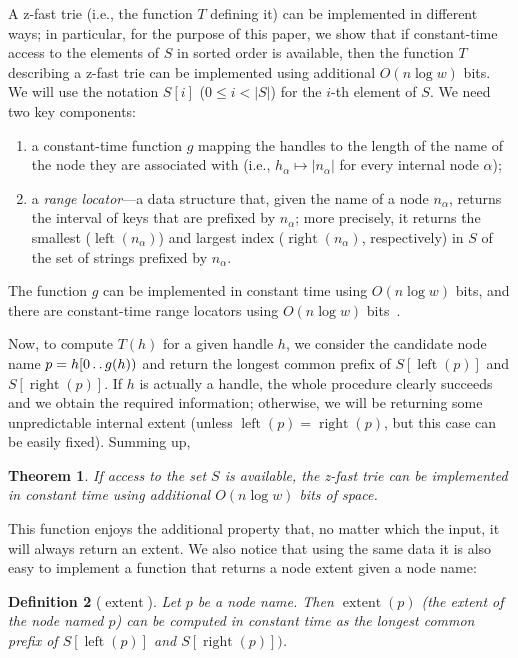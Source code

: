 \documentclass[a4paper,11pt]{article}
\newtheorem{theorem} {Theorem}[section]
\newtheorem{definition}[theorem]{Definition}
\newcommand{\?}{\mskip1.5mu}
\def\..{\,\mathpunct{\ldotp\ldotp}} %
\DeclareMathOperator{\lrange}{left}
\DeclareMathOperator{\rrange}{right}
\DeclareMathOperator{\extent}{extent}
\begin{document}
A z-fast trie (i.e., the function $T$ defining it) can be implemented in
different ways; in particular, for the purpose of this paper, we 
show that if constant-time access to the elements of $S$ in sorted order is
available, then the function $T$ describing a z-fast trie can be implemented using additional $O(n\log w)$ bits. We will use the
notation $S[i]$ ($0\leq i<|S|$) for the $i$-th element of $S$. We need two key
components:
\begin{enumerate}
  \item a constant-time function $g$ mapping the handles to the length of the
  name of the node they are associated with (i.e., $h_\alpha \mapsto
  |n_\alpha|$ for every internal node $\alpha$);
  \item a \emph{range locator}---a data structure that, given the name of a
  node $n_\alpha$, returns the interval of 
  keys that are prefixed by $n_\alpha$; more precisely, it returns the smallest
  ($\lrange(n_\alpha)$) and largest index ($\rrange(n_\alpha)$, respectively) in $S$ of
  the set of strings prefixed by $n_\alpha$.
\end{enumerate}
The function $g$ can be implemented in constant time using $O(n\log w)$ bits,
and there are constant-time range locators using $O(n\log w)$
bits~\cite{BelazzouguiBoPaVi09}.

Now, to compute $T(h)$ for a given handle $h$, we
consider the candidate node name $p = h[0\..g(h))$ and return the longest common
prefix of $S[\lrange(p)]$ and $S[\rrange(p)]$. If $h$ is actually a handle, the whole procedure clearly succeeds and
we obtain the required information; otherwise, we will be returning
some unpredictable internal extent (unless $\lrange(p)=\rrange(p)$, but this
case can be easily fixed). Summing up,
\begin{theorem}
\label{th:zfast}
If access to the set $S$ is available, the z-fast trie can be
implemented in constant time using additional $O(n\log w)$ bits of space.
\end{theorem}
This function enjoys the additional property that, no matter which
the input, it will always return an extent.
We also notice that using the same data it is also easy to implement a function
that returns a node extent given a node name:
\begin{definition}[$\extent$]
Let $p$ be a node name. Then $\extent(p)$ (the extent of the node named $p$)
can be computed in constant time as the longest common prefix of $S[\lrange(p)]$ and $S[\rrange(p)])$.
\end{definition}
\end{document}

